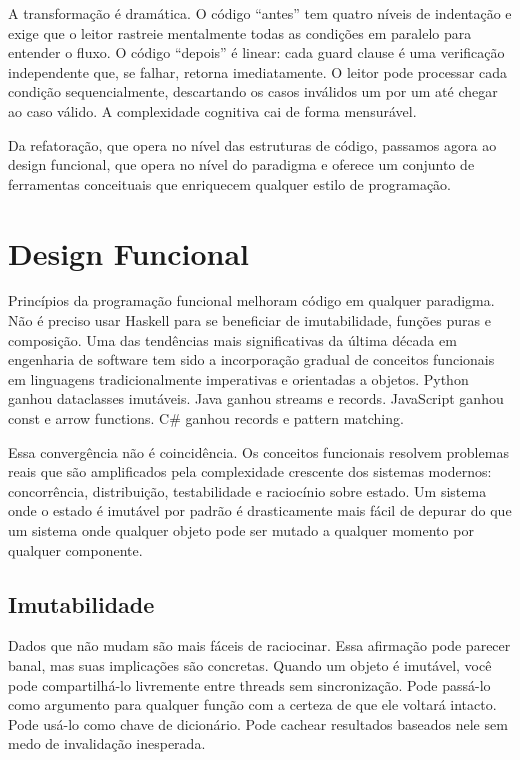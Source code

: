 A transformação é dramática. O código ``antes'' tem quatro níveis de
indentação e exige que o leitor rastreie mentalmente todas as condições
em paralelo para entender o fluxo. O código ``depois'' é linear: cada
guard clause é uma verificação independente que, se falhar, retorna
imediatamente. O leitor pode processar cada condição sequencialmente,
descartando os casos inválidos um por um até chegar ao caso válido. A
complexidade cognitiva cai de forma mensurável.

Da refatoração, que opera no nível das estruturas de código, passamos agora
ao design funcional, que opera no nível do paradigma e oferece um conjunto
de ferramentas conceituais que enriquecem qualquer estilo de programação.


\section{Design Funcional}

Princípios da programação funcional melhoram código em qualquer paradigma. Não é
preciso usar Haskell para se beneficiar de imutabilidade, funções puras e
composição. Uma das tendências mais significativas da última
década em engenharia de software tem sido a incorporação gradual de
conceitos funcionais em linguagens tradicionalmente imperativas e orientadas
a objetos. Python ganhou dataclasses imutáveis. Java ganhou streams e records.
JavaScript ganhou const e arrow functions. C\# ganhou records e pattern matching.

Essa convergência não é coincidência. Os conceitos funcionais resolvem
problemas reais que são amplificados pela complexidade crescente dos
sistemas modernos: concorrência, distribuição, testabilidade e raciocínio
sobre estado. Um sistema onde o estado é imutável por padrão é
drasticamente mais fácil de depurar do que um sistema onde qualquer objeto
pode ser mutado a qualquer momento por qualquer componente.

\subsection{Imutabilidade}

Dados que não mudam são mais fáceis de raciocinar. Essa afirmação pode
parecer banal, mas suas implicações são concretas. Quando um objeto é
imutável, você pode compartilhá-lo livremente entre threads sem
sincronização. Pode passá-lo como argumento para qualquer função com a
certeza de que ele voltará intacto. Pode usá-lo como chave de dicionário.
Pode cachear resultados baseados nele sem medo de invalidação inesperada.

